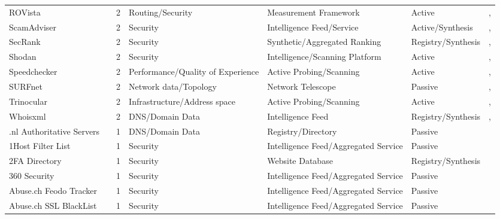 \documentclass[11pt,a4paper]{article}
\begin{document}
\begin{longtable}{@{}p{}p{}p{}p{}p{}p{}p{}@{}}
ROVista & \cite{10.1145/3618257.3624806} & 2 & Routing/Security & Measurement Framework & Active & \cite{10.1145/3777912.3809144}, \cite{10.1145/3777912.3839812} \\
ScamAdviser & \cite{scamadviser} & 2 & Security & Intelligence Feed/Service & Active/Synthesis & \cite{10.1145/3618257.3624822}, \cite{10.1145/3777912.3839787} \\
SecRank & \cite{secrank} & 2 & Security & Synthetic/Aggregated Ranking & Registry/Synthesis & \cite{10.1145/3646547.3688449}, \cite{10.1145/3517745.3561444} \\
Shodan & \cite{shodan} & 2 & Security & Intelligence/Scanning Platform & Active & \cite{10.1145/3487552.3487833}, \cite{10.1145/3487552.3487835} \\
Speedchecker & \cite{speedchecker} & 2 & Performance/Quality of Experience & Active Probing/Scanning & Active & \cite{10.1145/3487552.3487854}, \cite{10.1145/3487552.3487862} \\
SURFnet & \cite{surfnet} & 2 & Network data/Topology & Network Telescope & Passive & \cite{10.1145/3777912.3839790}, \cite{10.1007/978-3-032-18268-5_14} \\
Trinocular & \cite{trinocular} & 2 & Infrastructure/Address space & Active Probing/Scanning & Active & \cite{10.1145/3618257.3624796}, \cite{10.1007/978-3-031-56252-5_7} \\
Whoisxml & \cite{xml} & 2 & DNS/Domain Data & Intelligence Feed & Registry/Synthesis & \cite{10.1145/3618257.3624805}, \cite{10.1007/978-3-032-18268-5_15} \\
.nl Authoritative Servers & \cite{nl_authoritative_servers} & 1 & DNS/Domain Data & Registry/Directory & Passive & \cite{10.1007/978-3-030-72582-2_27} \\
1Host Filter List & \cite{1host_filter} & 1 & Security & Intelligence Feed/Aggregated Service & Passive & \cite{10.1007/978-3-030-98785-5_19} \\
2FA Directory & \cite{2fa} & 1 & Security & Website Database & Registry/Synthesis & \cite{10.1007/978-3-032-18268-5_15} \\
360 Security & \cite{360_security} & 1 & Security & Intelligence Feed/Aggregated Service & Passive & \cite{10.1145/3618257.3624839} \\
Abuse.ch Feodo Tracker & \cite{abusech_feodo} & 1 & Security & Intelligence Feed/Aggregated Service & Passive & \cite{10.1007/978-3-031-28486-1_6} \\
Abuse.ch SSL BlackList & \cite{abusech_sslbl} & 1 & Security & Intelligence Feed/Aggregated Service & Passive & \cite{10.1007/978-3-031-28486-1_6} \\

\end{longtable}
\end{document}
